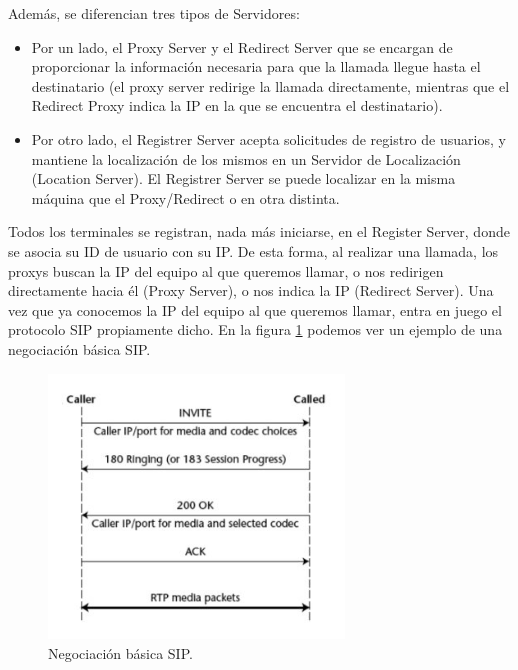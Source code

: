 \documentclass[a4paper]{article}
\begin{document}
Además, se diferencian tres tipos de Servidores:
\begin{itemize}
    \item Por un lado, el Proxy Server y el Redirect Server que se encargan de proporcionar la información necesaria para que la llamada llegue hasta el destinatario (el proxy server redirige la llamada directamente, mientras que el Redirect Proxy indica la IP en la que se encuentra el destinatario).
    
    \item Por otro lado, el Registrer Server acepta solicitudes de registro de usuarios, y mantiene la localización de los mismos en un Servidor de Localización (Location Server). El Registrer Server se puede localizar en la misma máquina que el Proxy/Redirect o en otra distinta. 
    
\end{itemize}  

Todos los terminales se registran, nada más iniciarse, en el Register Server, donde se asocia su ID de usuario con su IP. De esta forma, al realizar una llamada, los proxys buscan la IP del equipo al que queremos llamar, o nos redirigen directamente hacia él (Proxy Server), o nos indica la IP (Redirect Server).
Una vez que ya conocemos la IP del equipo al que queremos llamar, entra en juego el protocolo SIP propiamente dicho. En la figura \ref{fig:1} podemos ver un ejemplo de una negociación básica SIP.

\begin{figure}[htb]
\label{fig:1}
    \begin{center}
        \includegraphics[width=0.7\textwidth]{sip-register.jpg}
         \caption{Negociación básica SIP.}
    \end{center}
\end{figure}
\end{document}
